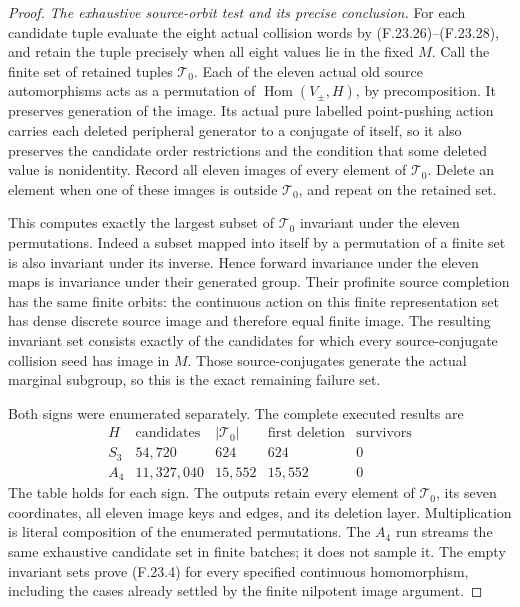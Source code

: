 \begin{proof}
\emph{The exhaustive source-orbit test and its precise conclusion.}
For each candidate tuple evaluate the eight actual collision
words by (F.23.26)--(F.23.28), and retain the tuple precisely
when all eight values lie in the fixed $M$. Call the finite
set of retained tuples $\mathcal T_0$. Each of the eleven
actual old source automorphisms acts as a permutation of
$\operatorname{Hom}(V_\pm,H)$, by precomposition.
It preserves generation of the image. Its actual pure
labelled point-pushing action carries each deleted
peripheral generator to a conjugate of itself, so it
also preserves the candidate order restrictions and the
condition that some deleted value is nonidentity.
Record all eleven images of every element of $\mathcal T_0$.
Delete an element when one of these images is outside
$\mathcal T_0$, and repeat on the retained set.

This computes exactly the largest subset of
$\mathcal T_0$ invariant under the eleven permutations.
Indeed a subset mapped into itself by a permutation of a
finite set is also invariant under its inverse. Hence
forward invariance under the eleven maps is invariance
under their generated group. Their profinite source
completion has the same finite orbits: the continuous
action on this finite representation set has dense
discrete source image and therefore equal finite image.
The resulting invariant set consists exactly of the
candidates for which every source-conjugate collision
seed has image in $M$. Those source-conjugates generate
the actual marginal subgroup, so this is the exact
remaining failure set.

Both signs were enumerated separately. The complete
executed results are
\[
 \begin{array}{c|r|r|r|r}
 H&\text{candidates}&|\mathcal T_0|&
       \text{first deletion}&\text{survivors}\\\hline
 S_3&54,720&624&624&0\\
 A_4&11,327,040&15,552&15,552&0
 \end{array}                                                  \tag{F.23.31}
\]
The table holds for each sign. The outputs retain every
element of $\mathcal T_0$, its seven coordinates, all
eleven image keys and edges, and its deletion layer.
Multiplication is literal composition of the enumerated
permutations. The $A_4$ run streams the same exhaustive
candidate set in finite batches; it does not sample it.
The empty invariant sets prove (F.23.4) for every specified
continuous homomorphism, including the cases already
settled by the finite nilpotent image argument.


\end{proof}
